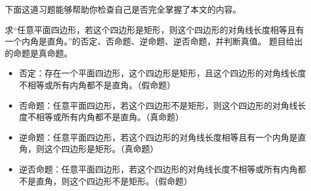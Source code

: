 下面这道习题能够帮助你检查自己是否完全掌握了本文的内容。
\begin{exercise}{求“任意平面四边形，若这个四边形是矩形，则这个四边形的对角线长度相等且有一个内角是直角。”的否定、否命题、逆命题、逆否命题，并判断真值。}
题目给出的命题是真命题。
\begin{itemize}
\item 否定：存在一个平面四边形，这个四边形是矩形，且这个四边形的对角线长度不相等或所有内角都不是直角。（假命题）
\item 否命题：任意平面四边形，若这个四边形不是矩形，则这个四边形的对角线长度不相等或所有内角都不是直角。（真命题）
\item 逆命题：任意平面四边形，若这个四边形的对角线长度相等且有一个内角是直角，则这个四边形是矩形。（真命题）
\item 逆否命题：任意平面四边形，若这个四边形的对角线长度不相等或所有内角都不是直角，则这个四边形不是矩形。（假命题）
\end{itemize}
\end{exercise}